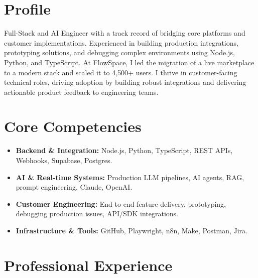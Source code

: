 \documentclass[11pt,a4paper,sans]{moderncv}
\begin{document}
\makecvtitle

\section{Profile}
Full-Stack and AI Engineer with a track record of bridging core platforms and customer implementations. Experienced in building production integrations, prototyping solutions, and debugging complex environments using Node.js, Python, and TypeScript. At FlowSpace, I led the migration of a live marketplace to a modern stack and scaled it to 4,500+ users. I thrive in customer-facing technical roles, driving adoption by building robust integrations and delivering actionable product feedback to engineering teams.

\section{Core Competencies}
\begin{itemize}
\item \textbf{Backend \& Integration:} Node.js, Python, TypeScript, REST APIs, Webhooks, Supabase, Postgres.
\item \textbf{AI \& Real-time Systems:} Production LLM pipelines, AI agents, RAG, prompt engineering, Claude, OpenAI.
\item \textbf{Customer Engineering:} End-to-end feature delivery, prototyping, debugging production issues, API/SDK integrations.
\item \textbf{Infrastructure \& Tools:} GitHub, Playwright, n8n, Make, Postman, Jira.
\end{itemize}

\section{Professional Experience}

\vspace{3pt}
\end{document}
